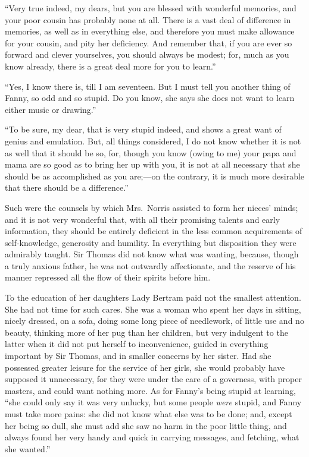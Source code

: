``Very true indeed, my dears, but you are blessed with
wonderful memories, and your poor cousin has probably none
at all.  There is a vast deal of difference in memories,
as well as in everything else, and therefore you must
make allowance for your cousin, and pity her deficiency.
And remember that, if you are ever so forward and clever
yourselves, you should always be modest; for, much as you
know already, there is a great deal more for you to learn.''

``Yes, I know there is, till I am seventeen.  But I must
tell you another thing of Fanny, so odd and so stupid.
Do you know, she says she does not want to learn either
music or drawing.''

``To be sure, my dear, that is very stupid indeed,
and shows a great want of genius and emulation.
But, all things considered, I do not know whether it is
not as well that it should be so, for, though you know
(owing to me) your papa and mama are so good as to bring
her up with you, it is not at all necessary that she
should be as accomplished as you are;---on the contrary,
it is much more desirable that there should be a difference.''

Such were the counsels by which Mrs.\ Norris assisted to form
her nieces' minds; and it is not very wonderful that,
with all their promising talents and early information,
they should be entirely deficient in the less common
acquirements of self-knowledge, generosity and humility.
In everything but disposition they were admirably taught.
Sir Thomas did not know what was wanting, because, though a
truly anxious father, he was not outwardly affectionate,
and the reserve of his manner repressed all the flow of their
spirits before him.

To the education of her daughters Lady Bertram paid not
the smallest attention.  She had not time for such cares.
She was a woman who spent her days in sitting, nicely dressed,
on a sofa, doing some long piece of needlework, of little use
and no beauty, thinking more of her pug than her children,
but very indulgent to the latter when it did not put
herself to inconvenience, guided in everything important
by Sir Thomas, and in smaller concerns by her sister.
Had she possessed greater leisure for the service of her girls,
she would probably have supposed it unnecessary, for they
were under the care of a governess, with proper masters,
and could want nothing more.  As for Fanny's being stupid
at learning, ``she could only say it was very unlucky,
but some people \emph{were} stupid, and Fanny must take more pains:
she did not know what else was to be done; and, except her
being so dull, she must add she saw no harm in the poor
little thing, and always found her very handy and quick
in carrying messages, and fetching, what she wanted.''

